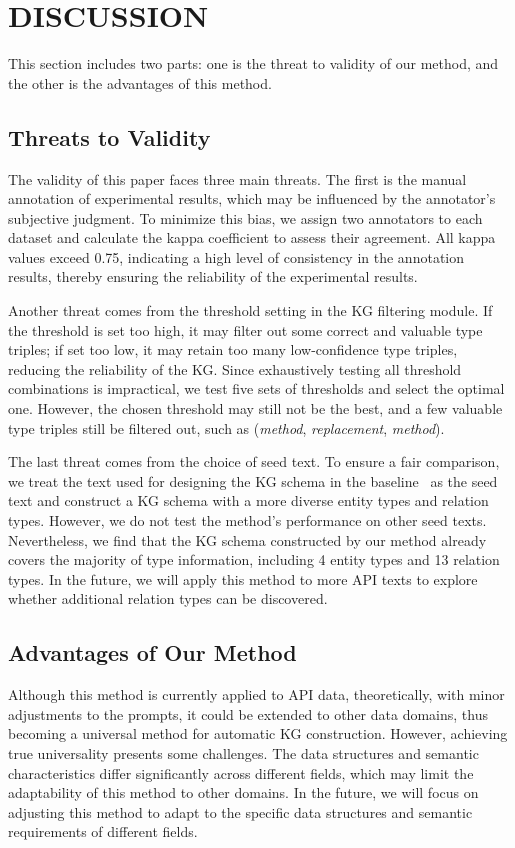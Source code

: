 \section{DISCUSSION}
This section includes two parts: one is the threat to validity of our method, and the other is the advantages of this method.

\vspace{-2mm}
\subsection{Threats to Validity}
The validity of this paper faces three main threats.
The first is the manual annotation of experimental results, which may be influenced by the annotator's subjective judgment. 
To minimize this bias, we assign two annotators to each dataset and calculate the kappa coefficient to assess their agreement. 
All kappa values exceed 0.75, indicating a high level of consistency in the annotation results, thereby ensuring the reliability of the experimental results.

Another threat comes from the threshold setting in the KG filtering module.
If the threshold is set too high, it may filter out some correct and valuable type triples; if set too low, it may retain too many low-confidence type triples, reducing the reliability of the KG.
Since exhaustively testing all threshold combinations is impractical, we test five sets of thresholds and select the optimal one.
However, the chosen threshold may still not be the best, and a few valuable type triples still be filtered out, such as (\textit{method}, \textit{replacement}, \textit{method}).

The last threat comes from the choice of seed text.
To ensure a fair comparison, we treat the text used for designing the KG schema in the baseline~\cite{Manual} as the seed text and construct a KG schema with a more diverse entity types and relation types.
However, we do not test the method's performance on other seed texts.
Nevertheless, we find that the KG schema constructed by our method already covers the majority of type information, including 4 entity types and 13 relation types.
In the future, we will apply this method to more API texts to explore whether additional relation types can be discovered.

\subsection{Advantages of Our Method}
Although this method is currently applied to API data, theoretically, with minor adjustments to the prompts, it could be extended to other data domains, thus becoming a universal method for automatic KG construction.
However, achieving true universality presents some challenges. 
The data structures and semantic characteristics differ significantly across different fields, which may limit the adaptability of this method to other domains. 
In the future, we will focus on adjusting this method to adapt to the specific data structures and semantic requirements of different fields.

